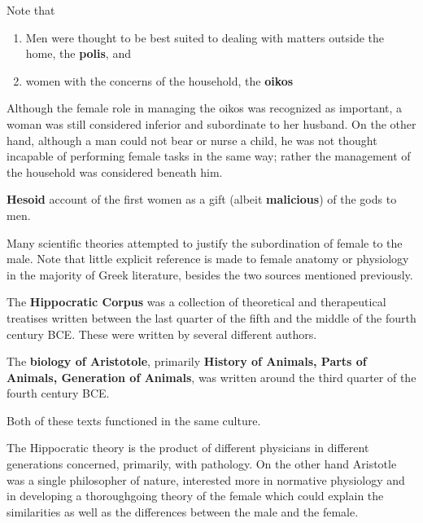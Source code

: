 Note that \begin{enumerate}
    \item Men were thought to be best suited to dealing with matters outside the home, the \textbf{polis}, and
    \item women with the concerns of the household, the \textbf{oikos}
\end{enumerate}

Although the female role in managing the oikos was recognized as important, a woman was still considered inferior and subordinate to her husband. On the other hand, although a man could not bear or nurse a child, he was not thought incapable of performing female tasks in the same way; rather the management of the household was considered beneath him.

\begin{rmk}
    \textbf{Hesoid} account of the first women as a gift (albeit \textbf{malicious}) of the gods to men.
\end{rmk}

Many scientific theories attempted to justify the subordination of female to the male. Note that little explicit reference is made to female anatomy or physiology in the majority of Greek literature, besides the two sources mentioned previously. 

\begin{defn}
    The \textbf{Hippocratic Corpus} was a collection of theoretical and therapeutical treatises written between the last quarter of the fifth and the middle of the fourth century BCE. These were written by several different authors.
\end{defn}

\begin{defn}
    The \textbf{biology of Aristotole}, primarily \textbf{History of Animals, Parts of Animals, Generation of Animals}, was written around the third quarter of the fourth century BCE.
\end{defn}

Both of these texts functioned in the same culture. 

\begin{rmk}
    The Hippocratic theory is the product of different physicians in different generations concerned, primarily, with pathology. On the other hand Aristotle was a single philosopher of nature, interested more in normative physiology and in developing a thoroughgoing theory of the female which could explain the similarities as well as the differences between the male and the female.
\end{rmk}

